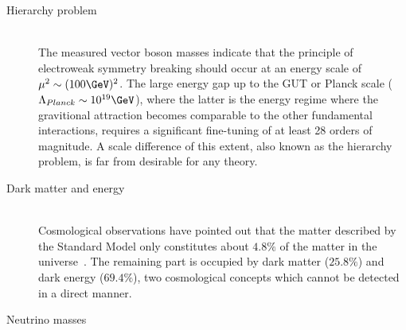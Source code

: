 \begin{myindentpar}
\begin{description}
    \item[Hierarchy problem] \hfill \\
    The measured vector boson masses indicate that the principle of electroweak symmetry breaking should occur at an energy scale of $\mu^{2} \sim (100 \GeV)^{2}$.
    The large energy gap up to the GUT or Planck scale ($\Lambda_{Planck} \sim 10^{19} \GeV$), where the latter is the energy regime where the gravitional attraction becomes comparable to the other fundamental interactions, requires a significant fine-tuning of at least 28 orders of magnitude. 
    A scale difference of this extent, also known as the hierarchy problem, is far from desirable for any theory.
    
    \item[Dark matter and energy] \hfill \\
    Cosmological observations have pointed out that the matter described by the Standard Model only constitutes about $4.8 \%$ of the matter in the universe~\cite{PlanckResults}. The remaining part is occupied by dark matter ($25.8 \%$) and dark energy ($69.4 \%$), two cosmological concepts which cannot be detected in a direct manner.
    
    
    \item[Neutrino masses] \hfill \\
    
   \end{description}
\end{myindentpar}
